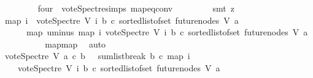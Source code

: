 \begin{isabellebody}
\ \ \ \ \ \ \ \isamarkupfalse%
\ four\ {}\ vote{\isacharunderscore}{\kern0pt}Spectre{\isachardot}{\kern0pt}simps\ map{\isacharunderscore}{\kern0pt}eq{\isacharunderscore}{\kern0pt}conv\isanewline
\ \ \ \ \ \ \ \isamarkupfalse%
\ {\isacharparenleft}{\kern0pt}smt\ {\isacharparenleft}{\kern0pt}z{}{\isacharparenright}{\kern0pt}{\isacharparenright}{\kern0pt}\isanewline
\ \ \ \ \ \isamarkupfalse%
\ {\isachardoublequoteopen}{\isacharparenleft}{\kern0pt}map\ {\isacharparenleft}{\kern0pt}{\isasymlambda}i{\isachardot}{\kern0pt}\ {\isacharminus}{\kern0pt}\ vote{\isacharunderscore}{\kern0pt}Spectre\ V\ i\ b\ c{\isacharparenright}{\kern0pt}\ {\isacharparenleft}{\kern0pt}sorted{\isacharunderscore}{\kern0pt}list{\isacharunderscore}{\kern0pt}of{\isacharunderscore}{\kern0pt}set\ {\isacharparenleft}{\kern0pt}future{\isacharunderscore}{\kern0pt}nodes\ V\ a{\isacharparenright}{\kern0pt}{\isacharparenright}{\kern0pt}{\isacharparenright}{\kern0pt}\isanewline
\ \ \ \ \ {\isacharequal}{\kern0pt}\ {\isacharparenleft}{\kern0pt}map\ uminus\ {\isacharparenleft}{\kern0pt}map\ {\isacharparenleft}{\kern0pt}{\isasymlambda}i{\isachardot}{\kern0pt}\ vote{\isacharunderscore}{\kern0pt}Spectre\ V\ i\ b\ c{\isacharparenright}{\kern0pt}\ {\isacharparenleft}{\kern0pt}sorted{\isacharunderscore}{\kern0pt}list{\isacharunderscore}{\kern0pt}of{\isacharunderscore}{\kern0pt}set\ {\isacharparenleft}{\kern0pt}future{\isacharunderscore}{\kern0pt}nodes\ V\ a{\isacharparenright}{\kern0pt}{\isacharparenright}{\kern0pt}{\isacharparenright}{\kern0pt}{\isacharparenright}{\kern0pt}{\isachardoublequoteclose}\ \isanewline
\ \ \ \ \ \ \ \isamarkupfalse%
\ map{\isacharunderscore}{\kern0pt}map\ \isamarkupfalse%
\ auto\ \ \ \ \ \ \ \isanewline
\ \ \ \ \ \isamarkupfalse%
\ \isamarkupfalse%
\ {\isachardoublequoteopen}vote{\isacharunderscore}{\kern0pt}Spectre\ V\ a\ c\ b\ {\isacharequal}{\kern0pt}\ {\isacharminus}{\kern0pt}\ {\isacharparenleft}{\kern0pt}sumlist{\isacharunderscore}{\kern0pt}break\ b\ c\ {\isacharparenleft}{\kern0pt}map\ {\isacharparenleft}{\kern0pt}{\isasymlambda}i{\isachardot}{\kern0pt}\isanewline
\ \ \ \ {\isacharparenleft}{\kern0pt}vote{\isacharunderscore}{\kern0pt}Spectre\ V\ i\ b\ c{\isacharparenright}{\kern0pt}{\isacharparenright}{\kern0pt}\ {\isacharparenleft}{\kern0pt}sorted{\isacharunderscore}{\kern0pt}list{\isacharunderscore}{\kern0pt}of{\isacharunderscore}{\kern0pt}set\ {\isacharparenleft}{\kern0pt}future{\isacharunderscore}{\kern0pt}nodes\ V\ a{\isacharparenright}{\kern0pt}{\isacharparenright}{\kern0pt}{\isacharparenright}{\kern0pt}{\isacharparenright}{\kern0pt}{\isachardoublequoteclose}\ \isanewline

\end{isabellebody}

